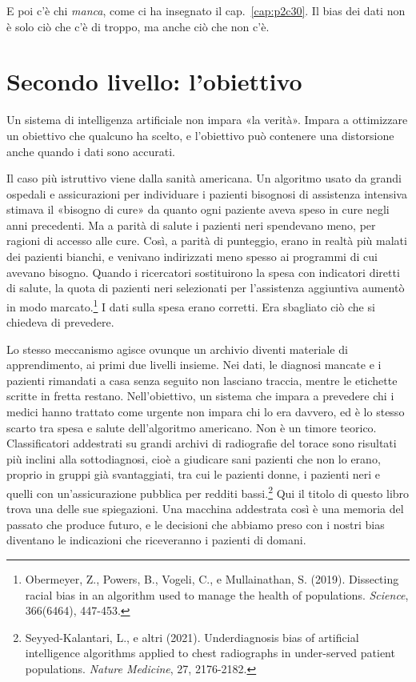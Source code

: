 E poi c'è chi \textit{manca}, come ci ha insegnato il cap.~\ref{cap:p2c30}. Il bias dei dati non è solo ciò che c'è di troppo, ma anche ciò che non c'è.

\section{Secondo livello: l'obiettivo}

Un sistema di intelligenza artificiale non impara «la verità». Impara a ottimizzare un obiettivo che qualcuno ha scelto, e l'obiettivo può contenere una distorsione anche quando i dati sono accurati.

Il caso più istruttivo viene dalla sanità americana. Un algoritmo usato da grandi ospedali e assicurazioni per individuare i pazienti bisognosi di assistenza intensiva stimava il «bisogno di cure» da quanto ogni paziente aveva speso in cure negli anni precedenti. Ma a parità di salute i pazienti neri spendevano meno, per ragioni di accesso alle cure. Così, a parità di punteggio, erano in realtà più malati dei pazienti bianchi, e venivano indirizzati meno spesso ai programmi di cui avevano bisogno. Quando i ricercatori sostituirono la spesa con indicatori diretti di salute, la quota di pazienti neri selezionati per l'assistenza aggiuntiva aumentò in modo marcato.\footnote{Obermeyer, Z., Powers, B., Vogeli, C., e Mullainathan, S. (2019). Dissecting racial bias in an algorithm used to manage the health of populations. \textit{Science}, 366(6464), 447-453.} I dati sulla spesa erano corretti. Era sbagliato ciò che si chiedeva di prevedere.

Lo stesso meccanismo agisce ovunque un archivio diventi materiale di apprendimento, ai primi due livelli insieme. Nei dati, le diagnosi mancate e i pazienti rimandati a casa senza seguito non lasciano traccia, mentre le etichette scritte in fretta restano. Nell'obiettivo, un sistema che impara a prevedere chi i medici hanno trattato come urgente non impara chi lo era davvero, ed è lo stesso scarto tra spesa e salute dell'algoritmo americano. Non è un timore teorico. Classificatori addestrati su grandi archivi di radiografie del torace sono risultati più inclini alla sottodiagnosi, cioè a giudicare sani pazienti che non lo erano, proprio in gruppi già svantaggiati, tra cui le pazienti donne, i pazienti neri e quelli con un'assicurazione pubblica per redditi bassi.\footnote{Seyyed-Kalantari, L., e altri (2021). Underdiagnosis bias of artificial intelligence algorithms applied to chest radiographs in under-served patient populations. \textit{Nature Medicine}, 27, 2176-2182.} Qui il titolo di questo libro trova una delle sue spiegazioni. Una macchina addestrata così è una memoria del passato che produce futuro, e le decisioni che abbiamo preso con i nostri bias diventano le indicazioni che riceveranno i pazienti di domani.

